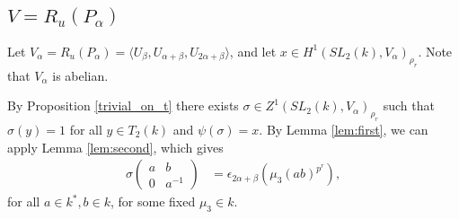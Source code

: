\subsection{$V = R_u(P_\alpha)$}
\label{b2:alpha}

Let $V_\alpha=R_u(P_\alpha)=\langle U_\beta, U_{\alpha + \beta}, U_{2\alpha + \beta} \rangle$, and let $x\in H^1(SL_2(k), V_\alpha)_{\rho_r}$. Note that $V_\alpha$ is abelian.

By Proposition \ref{trivial_on_t} there exists $\sigma\in Z^1(SL_2(k), V_\alpha)_{\rho_r}$ such that $\sigma(y) = 1$ for all $y\in T_2(k)$ and $\psi(\sigma) = x$. By Lemma \ref{lem:first}, we can apply Lemma \ref{lem:second}, which gives
\begin{align*}
	\sigma\left(\begin{matrix}a & b\\0 & a^{-1}\end{matrix}\right) &= \epsilon_{2\alpha+\beta}\left(\mu_3(ab)^{p^r}\right),
\end{align*}
for all $a\in k^*, b\in k$, for some fixed $\mu_3\in k$.

